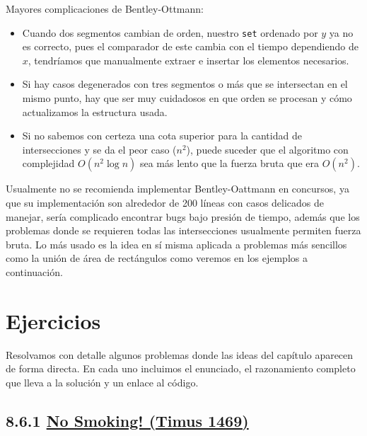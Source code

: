 Mayores complicaciones de Bentley-Ottmann:
\begin{itemize}
  \item Cuando dos segmentos cambian de orden, nuestro \texttt{set} ordenado por $y$ ya no es correcto, pues el comparador de este cambia con el tiempo dependiendo de $x$, tendríamos que manualmente extraer e insertar los elementos necesarios.
  \item Si hay casos degenerados con tres segmentos o más que se intersectan en el mismo punto, hay que ser muy cuidadosos en que orden se procesan y cómo actualizamos la estructura usada.
  \item Si no sabemos con certeza una cota superior para la cantidad de intersecciones y se da el peor caso ($n^2$), puede suceder que el algoritmo con complejidad $O(n^2\log n)$ sea más lento que la fuerza bruta que era $O(n^2)$.
\end{itemize}
Usualmente no se recomienda implementar Bentley-Oattmann en concursos, ya que su implementación son alrededor de 200 líneas con casos delicados de manejar, sería complicado encontrar bugs bajo presión de tiempo, además que los problemas donde se requieren todas las intersecciones usualmente permiten fuerza bruta. Lo más usado es la idea en sí misma aplicada a problemas más sencillos como la unión de área de rectángulos como veremos en los ejemplos a continuación.

\section{Ejercicios}

Resolvamos con detalle algunos problemas donde las ideas del capítulo aparecen de forma directa. En cada uno incluimos el enunciado, el razonamiento completo que lleva a la solución y un enlace al código.

\subsection*{8.6.1 \href{https://acm.timus.ru/problem.aspx?space=1&num=1469}{No Smoking! (Timus 1469)}}

